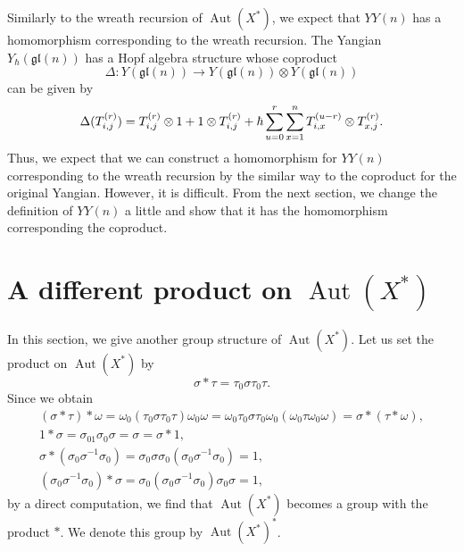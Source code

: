 \documentclass{article}
\theoremstyle{definition}
\theoremstyle{remark}
\numberwithin{equation}{section}
\DeclareMathOperator{\Aut}{Aut}
\numberwithin{equation}{section}
\begin{document}
Similarly to the wreath recursion of $\Aut(X^*)$, we expect that $YY(n)$ has a homomorphism corresponding to the wreath recursion.
The Yangian $Y_\hbar(\mathfrak{gl}(n))$ has a Hopf algebra structure whose coproduct 
\[
\Delta\colon Y(\mathfrak{gl}(n))\to Y(\mathfrak{gl}(n))\otimes Y(\mathfrak{gl}(n))
\]
can be given by
\[
\Delta(T^{(r)}_{i,j})=T^{(r)}_{i,j}\otimes 1+1\otimes T^{(r)}_{i,j}+\hbar\sum_{u=0}^r\limits\sum_{x=1}^n\limits T^{(u-r)}_{i,x}\otimes T^{(r)}_{x,j}.
\]
Thus, we expect that we can construct a homomorphism for $YY(n)$ corresponding to the wreath recursion by the similar way to the coproduct for the original Yangian. However, it is difficult. From the next section, we change the definition of $YY(n)$ a little and show that it has the homomorphism corresponding the coproduct.

\section{A different product on $\Aut(X^*)$}
In this section, we give another group structure of $\Aut(X^*)$.
Let us set the product on $\Aut(X^*)$ by
\[
\sigma\ast\tau=\tau_0\sigma\tau_0\tau.
\]
Since we obtain
\begin{gather*}
(\sigma\ast\tau)\ast\omega=\omega_0(\tau_0\sigma\tau_0\tau)\omega_0\omega=\omega_0\tau_0\sigma\tau_0\omega_0(\omega_0\tau\omega_0\omega)=\sigma\ast(\tau\ast\omega),\\
1\ast\sigma=\sigma_01\sigma_0\sigma=\sigma=\sigma\ast1,\\
\sigma\ast(\sigma_0\sigma^{-1}\sigma_0)=\sigma_0\sigma\sigma_0(\sigma_0\sigma^{-1}\sigma_0)=1,\\
(\sigma_0\sigma^{-1}\sigma_0)\ast\sigma=\sigma_0(\sigma_0\sigma^{-1}\sigma_0)\sigma_0\sigma=1,
\end{gather*}
by a direct computation, we find that $\Aut(X^*)$ becomes a group with the product $\ast$. 
We denote this group by $\Aut(X^*)^\ast$. 
\end{document}
